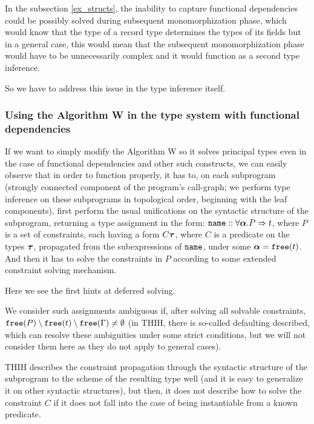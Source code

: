 In the subsection \ref{ex_structs}, the inability to capture functional dependencies could be possibly solved during subsequent monomorphization phase, which would know that the type of a record type determines the types of its fields but in a general case, this would mean that the subsequent monomorphization phase would have to be unnecessarily complex and it would function as a second type inference.

So we have to address this issue in the type inference itself.

\subsubsection*{Using the Algorithm W in the type system with functional dependencies}

If we want to simply modify the Algorithm W so it solves principal types even in the case of functional dependencies and other such constructs, we can easily observe that in order to function properly, it has to, on each subprogram (strongly connected component of the program's call-graph; we perform type inference on these subprograms in topological order, beginning with the leaf components), first perform the usual unifications on the syntactic structure of the subprogram, returning a type assignment in the form: $\mathtt{name} :: \forall \boldsymbol{\alpha} . P  \Rightarrow t$, where $P$ is a set of constraints, each having a form $C \boldsymbol{\tau}$, where $C$ is a predicate on the types $\boldsymbol{\tau}$, propagated from the subexpressions of $\mathtt{name}$, under some $\boldsymbol{\alpha} = \mathtt{free} (t)$. And then it has to solve the constraints in $P$ according to some extended constraint solving mechanism.

Here we see the first hints at deferred solving.

\begin{defn}
    We consider such assignments ambiguous if, after solving all solvable constraints, $\mathtt{free} (P) \setminus \mathtt{free} (t) \setminus \mathtt{free} (\Gamma) \neq \emptyset$ (in THIH, there is so-called defaulting described, which can resolve these ambiguities under some strict conditions, but we will not consider them here as they do not apply to general cases).
\end{defn}

THIH describes the constraint propagation through the syntactic structure of the subprogram to the scheme of the resulting type well (and it is easy to generalize it on other syntactic structures), but then, it does not describe how to solve the constraint $C$ if it does not fall into the case of being instantiable from a known predicate.

